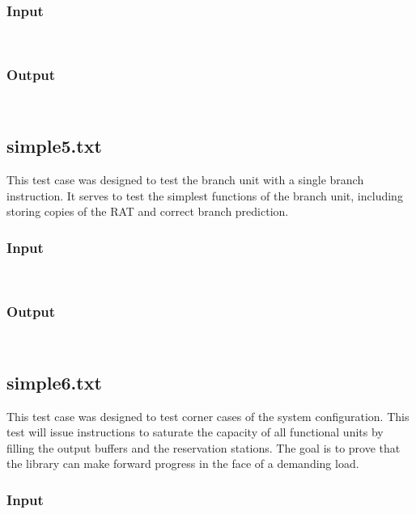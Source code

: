 \documentclass[12pt]{article}
\begin{document}
\subsubsection*{Input}
\begin{verbatim}
    
\end{verbatim}

\subsubsection*{Output}
\begin{verbatim}
    
\end{verbatim}

\subsection{simple5.txt}
This test case was designed to test the branch unit with a single branch instruction.  It serves to test the simplest functions of the branch unit, including storing copies of the RAT and correct branch prediction.

\subsubsection*{Input}
\begin{verbatim}
    
\end{verbatim}

\subsubsection*{Output}
\begin{verbatim}
    
\end{verbatim}

\subsection{simple6.txt}
This test case was designed to test corner cases of the system configuration.  This test will issue instructions to saturate the capacity of all functional units by filling the output buffers and the reservation stations.  The goal is to prove that the library can make forward progress in the face of a demanding load.

\subsubsection*{Input}
\begin{verbatim}
    
\end{verbatim}
\end{document}
